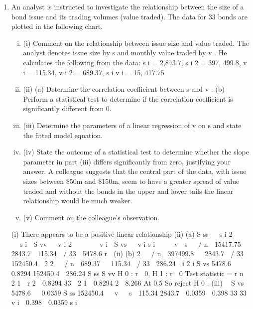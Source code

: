 \documentclass[a4paper,12pt]{article}
\begin{document}
\begin{enumerate}
\item An analyst is instructed to investigate the relationship between the size of a bond issue and its trading volumes (value traded). The data for 33 bonds are plotted in the following chart.

\begin{enumerate}[(i)]
\item (i)
Comment on the relationship between issue size and value traded. 
The analyst denotes issue size by s and monthly value traded by v . He calculates the following from the data:
\sum  s i = 2,843.7, \sum  s i 2 = 397, 499.8, \sum  v i = 115.34, \sum  v i 2 = 689.37, \sum  s i v i = 15, 417.75
\item (ii)
(a) Determine the correlation coefficient between s and v .
(b) Perform a statistical test to determine if the correlation coefficient is significantly different from 0.

\item
(iii) Determine the parameters of a linear regression of v on s and state the fitted model equation.

\item
(iv) State the outcome of a statistical test to determine whether the slope parameter in part (iii) differs significantly from zero, justifying your answer. A colleague suggests that the central part of the data, with issue sizes between \$50m
and \$150m, seem to have a greater spread of value traded and without the bonds in
the upper and lower tails the linear relationship would be much weaker.
\item
(v) Comment on the colleague’s observation.
\end{enumerate}

(i) There appears to be a positive linear relationship
(ii) (a)
S ss   s i 2   
   s i 
S vv   v i 2   
   v i 
S vs   v i s i     v  s   / n  15417.75   2843.7  115.34  / 33  5478.6
r 
(ii)
(b)
2 
 / n  397499.8   2843.7  / 33  152450.4

2
2 
 / n  689.37   115.34  / 33  286.24

i
2
i
S vs
5478.6

 0.8294
152450.4  286.24
S ss S vv
H 0 : r  0, H 1 : r  0
Test statistic = r
n  2
1  r
2

0.8294 33  2
1  0.8294
2
 8.266
At 0.5%
So reject H 0 .
(iii)

S vs
5478.6

 0.0359
S ss 152450.4
  v   s 
115.34
2843.7
 0.0359
 0.398
33
33
v i  0.398  0.0359 s i


\end{enumerate}
\end{document}
